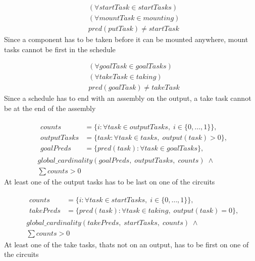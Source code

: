  \begin{equation}\label{eq:80}
 \begin{aligned}
 &(\forall startTask \in startTasks)\\
 &(\forall mountTask \in mounting)\\
 &pred(putTask) \neq startTask 
 \end{aligned}
 \end{equation}
 Since a component has to be taken before it can be mounted anywhere, mount tasks cannot be first in the schedule
 
 \begin{equation}\label{eq:81}
 \begin{aligned}
 &(\forall goalTask \in goalTasks) \\
 &(\forall takeTask \in taking) \\
 &pred(goalTask) \neq takeTask
 \end{aligned}
 \end{equation}
 Since a schedule has to end with an assembly on the output, a take task cannot be at the end of the assembly
 
 \begin{equation}
 \begin{aligned}\label{eq:82}
 &\begin{aligned}
 counts &= \{i : \forall task \in outputTasks, \; i \in \{0 , \ldots , 1\}\}, \\
 outputTasks &= \{task : \forall task \in tasks, \; output(task) > 0\}, \\
 goalPreds &= \{pred(task) : \forall task \in goalTasks\},
 \end{aligned} \\
 &global\_cardinality(goalPreds, \; outputTasks, \; counts) \; \land\\
 &\sum counts > 0
 \end{aligned}
 \end{equation}
 At least one of the output tasks has to be last on one of the circuits
 
 
 \begin{equation}
 \begin{aligned}\label{eq:83}
 &\begin{aligned}
 counts &= \{i : \forall task \in startTasks, \; i \in \{0 , \ldots , 1\}\}, \\
 takePreds &= \{pred(task) : \forall task \in taking, \; output(task) = 0\}, 
 \end{aligned}\\
 &global\_cardinality(takePreds, \; startTasks, \; counts) \; \land\\
 &\sum counts > 0
 \end{aligned}
 \end{equation}
 At least one of the take tasks, thats not on an output, has to be first on one of the circuits
 
